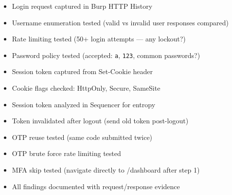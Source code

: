 \begin{tcolorbox}[findingstyle, title={Level 02 Burp Checklist}]
\begin{itemize}
  \item[\checkbox] Login request captured in Burp HTTP History
  \item[\checkbox] Username enumeration tested (valid vs invalid user responses compared)
  \item[\checkbox] Rate limiting tested (50+ login attempts — any lockout?)
  \item[\checkbox] Password policy tested (accepted: \texttt{a}, \texttt{123}, common passwords?)
  \item[\checkbox] Session token captured from Set-Cookie header
  \item[\checkbox] Cookie flags checked: HttpOnly, Secure, SameSite
  \item[\checkbox] Session token analyzed in Sequencer for entropy
  \item[\checkbox] Token invalidated after logout (send old token post-logout)
  \item[\checkbox] OTP reuse tested (same code submitted twice)
  \item[\checkbox] OTP brute force rate limiting tested
  \item[\checkbox] MFA skip tested (navigate directly to /dashboard after step 1)
  \item[\checkbox] All findings documented with request/response evidence
\end{itemize}
\end{tcolorbox}
